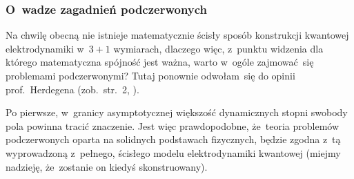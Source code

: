 \documentclass[10pt,t]{beamer}
\begin{document}







\begin{frame}
  \frametitle{O~wadze zagadnień podczerwonych}


  Na chwilę obecną nie istnieje matematycznie ścisły sposób konstrukcji
  kwantowej elektrodynamiki w~$3 + 1$ wymiarach, dlaczego więc, z~punktu
  widzenia dla którego matematyczna spójność jest ważna, warto w~ogóle
  zajmować~się problemami podczerwonymi? Tutaj ponownie odwołam~się do
  opinii prof.~Herdegena (zob.~str.~2,
  \parencite{Herdegen-Semidirect-product-of-CCR-and-CAR-algebras-ETC-Pub-1998}).

  Po pierwsze, w~granicy asymptotycznej większość dynamicznych stopni
  swobody pola powinna tracić znaczenie. Jest więc prawdopodobne, że~teoria
  problemów
  podczerwonych oparta na solidnych podstawach fizycznych, będzie zgodna
  z~tą wyprowadzoną z~pełnego, ścisłego modelu elektrodynamiki kwantowej
  (miejmy nadzieję, że~zostanie on kiedyś skonstruowany).

\end{frame}
\end{document}
